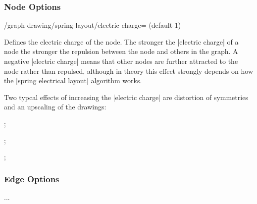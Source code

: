 
\subsubsection{Node Options}

\begin{key}{/graph drawing/spring layout/electric charge= 
  (default 1)}

  Defines the electric charge of the node. The stronger the 
  |electric charge| of a node the stronger the repulsion between the
  node and others in the graph. A negative |electric charge| means that
  other nodes are further attracted to the node rather than repulsed,
  although in theory this effect strongly depends on how the 
  |spring electrical layout| algorithm works.

  Two typcal effects of increasing the |electric charge| are distortion
  of symmetries and an upscaling of the drawings:
  \begin{codeexample}[width=5cm] 
\tikz {};

\tikz {};

\tikz {};
  \end{codeexample}
\end{key}

\subsubsection{Edge Options}

...

\endinput

